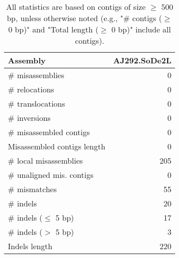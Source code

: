 \documentclass[12pt,a4paper]{article}
\begin{document}
\begin{table}[ht]
\begin{center}
\caption{All statistics are based on contigs of size $\geq$ 500 bp, unless otherwise noted (e.g., "\# contigs ($\geq$ 0 bp)" and "Total length ($\geq$ 0 bp)" include all contigs).}
\begin{tabular}{|l*{1}{|r}|}
\hline
Assembly & AJ292.SoDe2L \\ \hline
\# misassemblies & 0 \\ \hline
\hspace{5mm}\# relocations & 0 \\ \hline
\hspace{5mm}\# translocations & 0 \\ \hline
\hspace{5mm}\# inversions & 0 \\ \hline
\# misassembled contigs & 0 \\ \hline
Misassembled contigs length & 0 \\ \hline
\# local misassemblies & 205 \\ \hline
\# unaligned mis. contigs & 0 \\ \hline
\# mismatches & 55 \\ \hline
\# indels & 20 \\ \hline
\hspace{5mm}\# indels ($\leq$ 5 bp) & 17 \\ \hline
\hspace{5mm}\# indels ($>$ 5 bp) & 3 \\ \hline
Indels length & 220 \\ \hline
\end{tabular}
\end{center}
\end{table}
\end{document}
